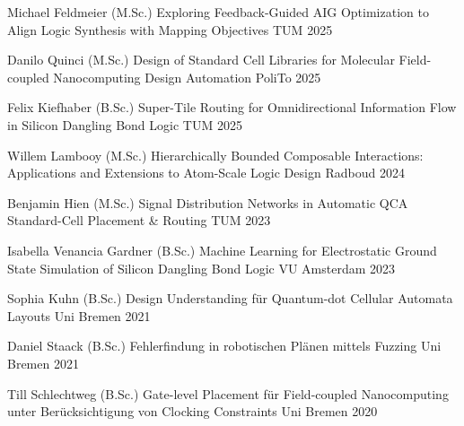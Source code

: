 \begin{cvhonors}

  \cvhonor
    {Michael Feldmeier (M.Sc.)} %
    {Exploring Feedback-Guided AIG Optimization to Align Logic Synthesis with Mapping Objectives} %
    {TUM} %
    {2025} %

  \cvhonor
    {Danilo Quinci (M.Sc.)} %
    {Design of Standard Cell Libraries for Molecular Field-coupled Nanocomputing Design Automation} %
    {PoliTo} %
    {2025} %

  \cvhonor
    {Felix Kiefhaber (B.Sc.)} %
    {Super-Tile Routing for Omnidirectional Information Flow in Silicon Dangling Bond Logic} %
    {TUM} %
    {2025} %

  \cvhonor
    {Willem Lambooy (M.Sc.)} %
    {Hierarchically Bounded Composable Interactions: Applications and Extensions to Atom-Scale Logic Design} %
    {Radboud} %
    {2024} %

  \cvhonor
    {Benjamin Hien (M.Sc.)} %
    {Signal Distribution Networks in Automatic QCA Standard-Cell Placement \& Routing} %
    {TUM} %
    {2023} %

  \cvhonor
    {Isabella Venancia Gardner (B.Sc.)} %
    {Machine Learning for Electrostatic Ground State Simulation of Silicon Dangling Bond Logic} %
    {VU Amsterdam} %
    {2023} %

  \cvhonor
    {Sophia Kuhn (B.Sc.)} %
    {Design Understanding f\"ur Quantum-dot Cellular Automata Layouts} %
    {Uni Bremen} %
    {2021} %

  \cvhonor
    {Daniel Staack (B.Sc.)} %
    {Fehlerfindung in robotischen Pl\"anen mittels Fuzzing} %
    {Uni Bremen} %
    {2021} %

  \cvhonor
    {Till Schlechtweg (B.Sc.)} %
    {Gate-level Placement f\"ur Field-coupled Nanocomputing unter Ber\"ucksichtigung von Clocking Constraints} %
    {Uni Bremen} %
    {2020} %

\end{cvhonors}
